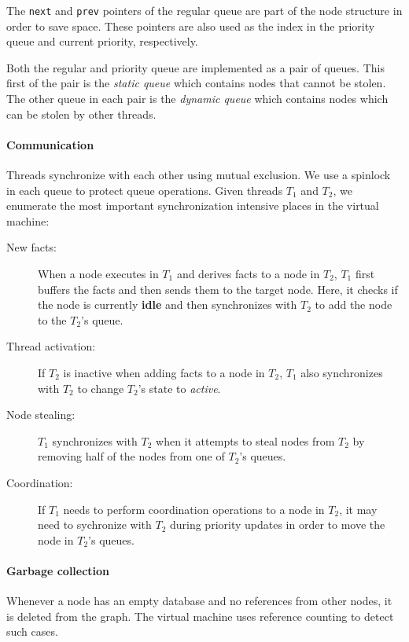 The \texttt{next} and \texttt{prev} pointers of the regular queue are
part of the node structure in order to save space. These pointers are
also used as the index in the priority queue and current priority,
respectively.

Both the regular and priority queue are implemented as a pair of
queues.  This first of the pair is the \emph{static queue} which
contains nodes that cannot be stolen.  The other queue in each pair is
the \emph{dynamic queue} which contains nodes which can be stolen by
other threads.

\paragraph{Communication}

Threads synchronize with each other using mutual exclusion. We use a spinlock in
each queue to protect queue operations.
Given threads $T_1$ and $T_2$, we enumerate the most important
synchronization intensive places in the virtual machine:

\begin{description}
   \item[New facts:] When a node executes in $T_1$ and derives facts
   to a node in $T_2$, $T_1$ first buffers the facts 
   and then sends them to the target node. Here, it checks if the
   node is currently \textbf{idle} and then synchronizes with $T_2$ to add the
   node to the $T_2$'s queue.
   \item[Thread activation:] If $T_2$ is inactive when adding facts to a node in
   $T_2$, $T_1$ also synchronizes with $T_2$ to change $T_2$'s state to \emph{active}.
   \item[Node stealing:] $T_1$ synchronizes with $T_2$ when it attempts to steal
   nodes from $T_2$ by removing half of the nodes from one of $T_2$'s queues.
   \item[Coordination:] If $T_1$ needs to perform coordination operations
   to a node in $T_2$, it may need to sychronize with $T_2$ during priority
   updates in order to move the node in $T_2$'s queues.
\end{description}

\paragraph{Garbage collection}

Whenever a node has an empty database and no references from other nodes, it is
deleted from the graph. The virtual machine uses reference counting to detect
such cases.

